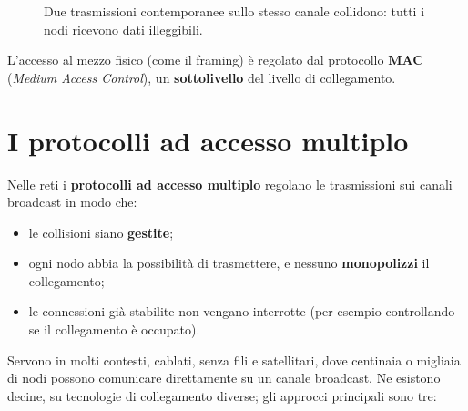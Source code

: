 \begin{figure}[H]
\centering
{}
\caption{Due trasmissioni contemporanee sullo stesso canale collidono: tutti i nodi ricevono dati illeggibili.}
\end{figure}

L'accesso al mezzo fisico (come il framing) è regolato dal protocollo \textbf{MAC} (\emph{Medium Access Control}), un
\textbf{sottolivello} del livello di collegamento.

\section{I protocolli ad accesso multiplo}

Nelle reti i \textbf{protocolli ad accesso multiplo} regolano le trasmissioni sui canali broadcast in modo che:

\begin{itemize}
    \item le collisioni siano \textbf{gestite};
    \item ogni nodo abbia la possibilità di trasmettere, e nessuno \textbf{monopolizzi} il collegamento;
    \item le connessioni già stabilite non vengano interrotte (per esempio controllando se il collegamento è occupato).
\end{itemize}

Servono in molti contesti, cablati, senza fili e satellitari, dove centinaia o migliaia di nodi possono comunicare direttamente su un
canale broadcast. Ne esistono decine, su tecnologie di collegamento diverse; gli approcci principali sono tre:

